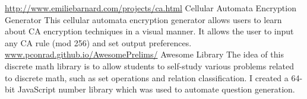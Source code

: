 \begin{cventries}
  \cventry
     {\href{http://www.cellularautomata.info}{http://www.emiliebarnard.com/projects/ca.html}}
    {Cellular Automata Encryption Generator}
    {}
    {}
    {
         This cellular automata encryption generator allows users to learn about CA encryption techniques in a visual manner. It allows the user to input any CA rule (mod 256) and set output preferences.
    }
\cventry
     {\href{http://pconrad.github.io/AwesomePrelims/}{www.pconrad.github.io/AwesomePrelims/}}
    {Awesome Library}
    {}
    {}
    {
         The idea of this discrete math library is to allow students to self-study various problems related to discrete math, such as set operations and relation classification. I created a 64-bit JavaScript number library which was used to automate question generation.
    }


\end{cventries}